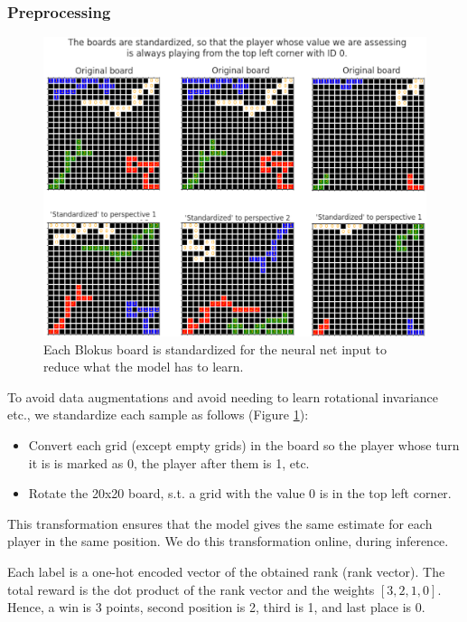 \documentclass{article}
\begin{document}
\subsubsection{Preprocessing}
\begin{figure}
    \centering
    \includegraphics[width=1\linewidth]{blokus_std_boards_edited.png}
    \caption{Each Blokus board is standardized for the neural net input to reduce what the model has to learn.}
    \label{fig:blokus-board-std}
\end{figure}

To avoid data augmentations and avoid needing to learn rotational invariance etc., we standardize each sample as follows (Figure \ref{fig:blokus-board-std}):
\begin{itemize}
    \item Convert each grid (except empty grids) in the board so the player whose turn it is is marked as 0, the player after them is 1, etc.
    \item Rotate the 20x20 board, s.t. a grid with the value 0 is in the top left corner.
\end{itemize}
This transformation ensures that the model gives the same estimate for each player in the same position. We do this transformation online, during inference.

Each label is a one-hot encoded vector of the obtained rank (rank vector). The total reward is the dot product of the rank vector and the weights $[3,2,1,0]$. Hence, a win is 3 points, second position is 2, third is 1, and last place is 0.
\end{document}
